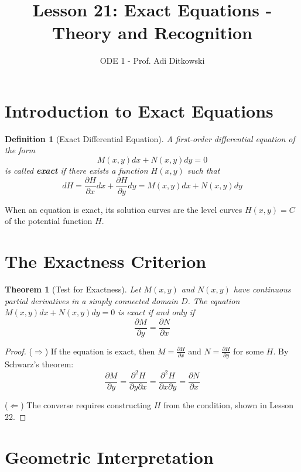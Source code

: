\documentclass[12pt]{article}
\title{Lesson 21: Exact Equations - Theory and Recognition}
\author{ODE 1 - Prof. Adi Ditkowski}
\date{}
\newtheorem{definition}{Definition}
\newtheorem{theorem}{Theorem}
\begin{document}
\maketitle

\section{Introduction to Exact Equations}

\begin{definition}[Exact Differential Equation]
A first-order differential equation of the form
\[M(x,y)dx + N(x,y)dy = 0\]
is called \textbf{exact} if there exists a function $H(x,y)$ such that
\[dH = \frac{\partial H}{\partial x}dx + \frac{\partial H}{\partial y}dy = M(x,y)dx + N(x,y)dy\]
\end{definition}

\begin{keypoint}
When an equation is exact, its solution curves are the level curves $H(x,y) = C$ of the potential function $H$.
\end{keypoint}

\section{The Exactness Criterion}

\begin{theorem}[Test for Exactness]
Let $M(x,y)$ and $N(x,y)$ have continuous partial derivatives in a simply connected domain $D$. The equation $M(x,y)dx + N(x,y)dy = 0$ is exact if and only if
\[\boxed{\frac{\partial M}{\partial y} = \frac{\partial N}{\partial x}}\]
\end{theorem}

\begin{proof}
($\Rightarrow$) If the equation is exact, then $M = \frac{\partial H}{\partial x}$ and $N = \frac{\partial H}{\partial y}$ for some $H$. By Schwarz's theorem:
\[\frac{\partial M}{\partial y} = \frac{\partial^2 H}{\partial y \partial x} = \frac{\partial^2 H}{\partial x \partial y} = \frac{\partial N}{\partial x}\]

($\Leftarrow$) The converse requires constructing $H$ from the condition, shown in Lesson 22.
\end{proof}

\section{Geometric Interpretation}
\end{document}
